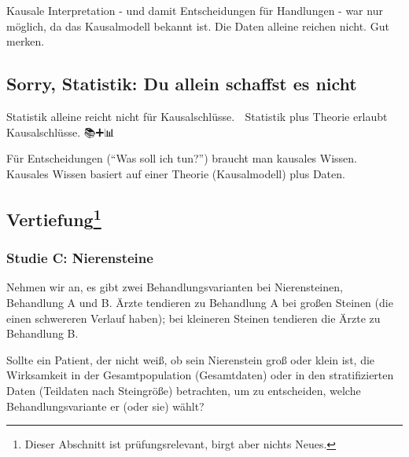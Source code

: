 \documentclass[
  a4paper,
  DIV=11]{scrreprt}
\theoremstyle{definition}
\theoremstyle{remark}
\begin{document}
Kausale Interpretation - und damit Entscheidungen für Handlungen - war
nur möglich, da das Kausalmodell bekannt ist. Die Daten alleine reichen
nicht. Gut merken.

\hypertarget{sorry-statistik-du-allein-schaffst-es-nicht}{%
\subsection{Sorry, Statistik: Du allein schaffst es
nicht}\label{sorry-statistik-du-allein-schaffst-es-nicht}}

Statistik alleine reicht nicht für Kausalschlüsse. 🧟 Statistik plus
Theorie erlaubt Kausalschlüsse. 📚➕📊 🟰 🤩

\begin{tcolorbox}[enhanced jigsaw, left=2mm, colframe=quarto-callout-important-color-frame, opacityback=0, arc=.35mm, rightrule=.15mm, breakable, toptitle=1mm, colbacktitle=quarto-callout-important-color!10!white, colback=white, coltitle=black, bottomrule=.15mm, titlerule=0mm, opacitybacktitle=0.6, bottomtitle=1mm, title=\textcolor{quarto-callout-important-color}{\faExclamation}\hspace{0.5em}{Wichtig}, toprule=.15mm, leftrule=.75mm]
Für Entscheidungen (``Was soll ich tun?'') braucht man kausales Wissen.
Kausales Wissen basiert auf einer Theorie (Kausalmodell) plus Daten.
\end{tcolorbox}

\hypertarget{vertiefung-3}{%
\subsection[Vertiefung]{\texorpdfstring{Vertiefung\footnote{Dieser
  Abschnitt ist prüfungsrelevant, birgt aber nichts Neues.}}{Vertiefung}}\label{vertiefung-3}}

\hypertarget{studie-c-nierensteine}{%
\subsubsection{Studie C: Nierensteine}\label{studie-c-nierensteine}}

Nehmen wir an, es gibt zwei Behandlungsvarianten bei Nierensteinen,
Behandlung A und B. Ärzte tendieren zu Behandlung A bei großen Steinen
(die einen schwereren Verlauf haben); bei kleineren Steinen tendieren
die Ärzte zu Behandlung B.

Sollte ein Patient, der nicht weiß, ob sein Nierenstein groß oder klein
ist, die Wirksamkeit in der Gesamtpopulation (Gesamtdaten) oder in den
stratifizierten Daten (Teildaten nach Steingröße) betrachten, um zu
entscheiden, welche Behandlungsvariante er (oder sie) wählt?
\end{document}
